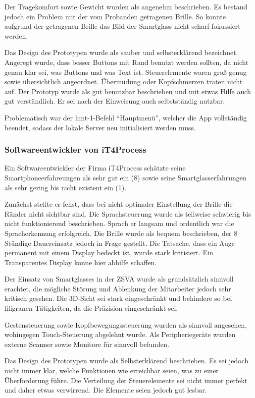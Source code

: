 Der Tragekomfort sowie Gewicht wurden als angenehm beschrieben. Es bestand jedoch ein Problem mit der vom Probanden getragenen Brille. So konnte aufgrund der getragenen Brille das Bild der Smartglass nicht scharf fokussiert werden.

Das Design des Prototypen wurde als sauber und selbsterklärend bezeichnet. Angeregt wurde, dass besser Buttons mit Rand benutzt werden sollten, da nicht genau klar sei, was Buttons und was Text ist. Steuerelemente waren groß genug sowie übersichtlich angeordnet. Übermüdung oder Kopfschmerzen traten nicht auf. Der Prototyp wurde als gut benutzbar beschrieben und mit etwas Hilfe auch gut verständlich. Er sei nach der Einweisung auch selbstständig nutzbar.

Problematisch war der hmt-1-Befehl \enquote{Hauptmenü}, welcher die App vollständig beendet, sodass der lokale Server neu initialisiert werden muss.
%
%
\subsubsection{Softwareentwickler von iT4Process}
Ein Softwareentwickler der Firma iT4Process schätzte seine Smartphoneerfahreungen als sehr gut ein (8) sowie seine Smartglasserfahrungen als sehr gering bis nicht existent ein (1).

Zunächst stellte er fehst, dass bei nicht optimaler Einstellung der Brille die Ränder nicht sichtbar sind. Die Sprachsteuerung wurde als teilweise schwierig bis nicht funktionierend beschrieben. Sprach er langsam und ordentlich war die Spracherkennung erfolgreich. Die Brille wurde als bequem beschrieben, der 8 Stündige Dauereinsatz jedoch in Frage gestellt. Die Tatsache, dass ein Auge permanent mit einem Display bedeckt ist, wurde stark kritisiert. Ein Transparentes Display könne hier abhilfe schaffen.

Der Einsatz von Smartglasses in der ZSVA wurde als grundsätzlich sinnvoll erachtet, die mögliche Störung und Ablenkung der Mitarbeiter jedoch sehr kritisch gesehen. Die 3D-Sicht sei stark eingeschränkt und behindere so bei filigranen Tätigkeiten, da die Präzision eingeschränkt sei.

Gestensteuerung sowie Kopfbewegungssteuerung wurden als sinnvoll angesehen, wohingegen Touch-Steuerung abgelehnt wurde. Als Peripheriegeräte wurden externe Scanner sowie Monitore für sinnvoll befunden.

Das Design des Prototypen wurde als Selbsterklärend beschrieben. Es sei jedoch nicht immer klar, welche Funktionen wie erreichbar seien, was zu einer Überforderung führe. Die Verteilung der Steuerelemente sei nicht immer perfekt und daher etwas verwirrend. Die Elemente seien jedoch gut lesbar.

